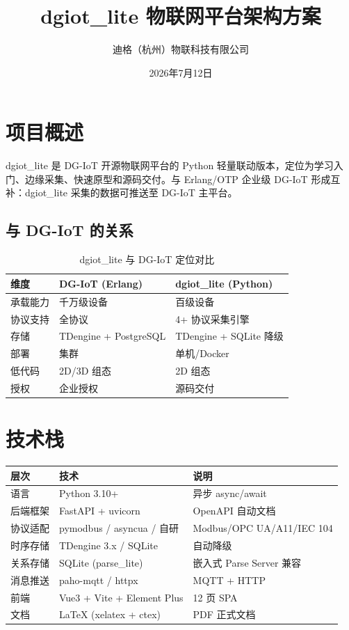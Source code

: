 \documentclass[12pt,a4paper]{ctexart}
\title{\textbf{dgiot\_lite 物联网平台架构方案}}
\author{迪格（杭州）物联科技有限公司}
\date{2026年7月12日}
\begin{document}
\maketitle
\tableofcontents
\newpage

\section{项目概述}

dgiot\_lite 是 DG-IoT 开源物联网平台的 Python 轻量联动版本，定位为学习入门、边缘采集、快速原型和源码交付。与 Erlang/OTP 企业级 DG-IoT 形成互补：dgiot\_lite 采集的数据可推送至 DG-IoT 主平台。

\subsection{与 DG-IoT 的关系}

\begin{table}[H]\centering
\caption{dgiot\_lite 与 DG-IoT 定位对比}
\begin{tabular}{p{5cm}p{4cm}p{4cm}}
\toprule
\textbf{维度} & \textbf{DG-IoT (Erlang)} & \textbf{dgiot\_lite (Python)} \\
\midrule
承载能力 & 千万级设备 & 百级设备 \\
协议支持 & 全协议 & 4+ 协议采集引擎 \\
存储 & TDengine + PostgreSQL & TDengine + SQLite 降级 \\
部署 & 集群 & 单机/Docker \\
低代码 & 2D/3D 组态 & 2D 组态 \\
授权 & 企业授权 & 源码交付 \\
\bottomrule
\end{tabular}
\end{table}

\section{技术栈}

\begin{table}[H]\centering
\begin{tabular}{p{3cm}p{4cm}p{5cm}}
\toprule
\textbf{层次} & \textbf{技术} & \textbf{说明} \\
\midrule
语言 & Python 3.10+ & 异步 async/await \\
后端框架 & FastAPI + uvicorn & OpenAPI 自动文档 \\
协议适配 & pymodbus / asyncua / 自研 & Modbus/OPC UA/A11/IEC 104 \\
时序存储 & TDengine 3.x / SQLite & 自动降级 \\
关系存储 & SQLite (parse\_lite) & 嵌入式 Parse Server 兼容 \\
消息推送 & paho-mqtt / httpx & MQTT + HTTP \\
前端 & Vue3 + Vite + Element Plus & 12 页 SPA \\
文档 & LaTeX (xelatex + ctex) & PDF 正式文档 \\
\bottomrule
\end{tabular}
\end{table}
\end{document}
